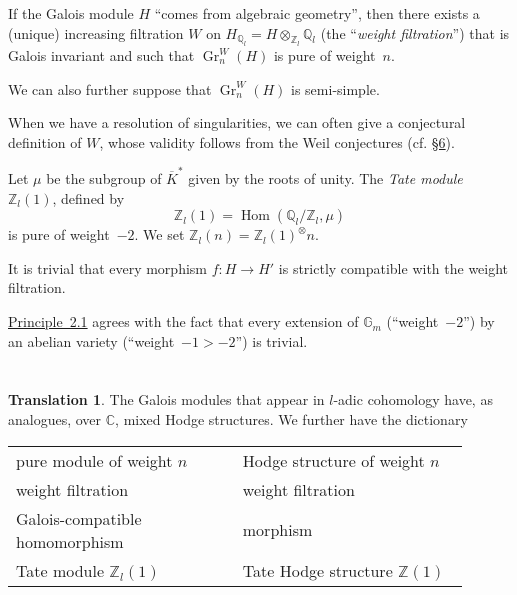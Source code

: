\documentclass{article}
\theoremstyle{plain}
\theoremstyle{definition}
\newenvironment{principle}[1]
    {\renewcommand\theinnerprinciple{#1}\innerprinciple}
    {\endinnerprinciple}
\newtheorem*{translation*}{Translation}
\newcommand{\ZZ}{\mathbb{Z}}
\newcommand{\QQ}{\mathbb{Q}}
\newcommand{\CC}{\mathbb{C}}
\DeclareMathOperator{\Gr}{Gr}
\DeclareMathOperator{\Hom}{Hom}
\begin{document}
\begin{principle}{2.1}
\label{principle-2.1}
  If the Galois module $H$ ``comes from algebraic geometry'', then there exists a (unique) increasing filtration $W$ on $H_{\QQ_l}=H\otimes_{\ZZ_l}\QQ_l$ (the ``\emph{weight filtration}'') that is Galois invariant and such that $\Gr_n^W(H)$ is pure of weight~$n$.
\end{principle}

We can also further suppose that $\Gr_n^W(H)$ is semi-simple.

When we have a resolution of singularities, we can often give a conjectural definition of $W$, whose validity follows from the Weil conjectures \cite{5} (cf. \hyperref[6]{\S6}).

Let $\mu$ be the subgroup of $\overline{K}^*$ given by the roots of unity.
The \emph{Tate module $\ZZ_l(1)$}, defined by
\[
  \ZZ_l(1) = \Hom(\QQ_l/\ZZ_l,\mu)
\]
is pure of weight~$-2$.
We set $\ZZ_l(n)=\ZZ_l(1)^\otimes n$.

It is trivial that every morphism $f\colon H\to H'$ is strictly compatible with the weight filtration.

\hyperref[principle-2.1]{Principle~2.1} agrees with the fact that every extension of $\mathbb{G}_m$ (``weight~$-2$'') by an abelian variety (``weight~$-1>-2$'') is trivial.


\section{}
\label{3}

\begin{translation*}
  The Galois modules that appear in $l$-adic cohomology have, as analogues, over $\CC$, mixed Hodge structures.
  We further have the dictionary
  
  \bigskip\noindent
  \begin{tabular}{p{0.45\linewidth}|p{0.45\linewidth}}
    \toprule
    pure module of weight $n$
    & Hodge structure of weight $n$
  \\weight filtration
    & weight filtration
  \\Galois-compatible homomorphism
    & morphism
  \\Tate module $\ZZ_l(1)$
    & Tate Hodge structure $\ZZ(1)$
  \\\bottomrule
  \end{tabular}
\end{translation*}


\section{}
\label{4}
\end{document}
